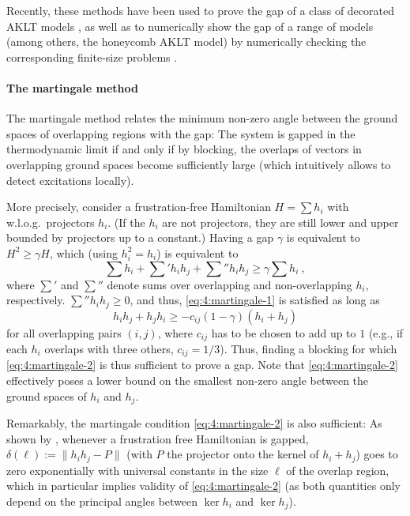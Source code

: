 \documentclass[rmp,aps,reprint,superscriptaddress,nobalancelastpage]{revtex4-1}
\begin{document}
    Recently, these methods have been used to prove the gap of a class of decorated AKLT models \cite{abdul2019class}, as well as to numerically show the gap of a range of models (among others, the honeycomb AKLT model) by numerically checking the corresponding finite-size problems \cite{lemm2019existence,pomata2019demonstrating}.



    \paragraph{The martingale method}

    The martingale method \cite{fannes:FCS,nachtergaele:degen-mps,kastoryano:martingale} relates the minimum non-zero angle between the ground spaces of overlapping regions with the gap: The system is gapped in the thermodynamic limit if and only if by blocking, the overlaps of vectors in overlapping ground spaces become sufficiently large (which intuitively allows to detect excitations locally).

    More precisely, consider a frustration-free Hamiltonian $H=\sum h_i$ with w.l.o.g.\ projectors $h_i$. (If the $h_i$ are not projectors, they are still lower and upper bounded by projectors up to a constant.) Having a gap $\gamma$ is equivalent to $H^2 \ge \gamma H$, which (using $h_i^2=h_i$) is equivalent to
    \begin{equation}
        \label{eq:4:martingale-1}
        \sum h_i + \sum\nolimits' h_i h_j + \sum\nolimits'' h_ih_j \ge \gamma \sum h_i\ ,
    \end{equation}
    where $\sum'$ and $\sum''$ denote sums over overlapping and non-overlapping $h_i$, respectively.  $\sum''h_ih_j\ge0$, and thus, \eqref{eq:4:martingale-1} is satisfied as long as
    \begin{equation}
        \label{eq:4:martingale-2}
        h_ih_j+h_jh_i \ge -c_{ij} (1-\gamma)(h_i+h_j)
    \end{equation}
    for all overlapping pairs $(i,j)$, where $c_{ij}$ has to be chosen to add up to $1$ (e.g., if each $h_i$ overlaps with three others, $c_{ij}=1/3$).  Thus, finding a blocking for which \eqref{eq:4:martingale-2} is thus sufficient to prove a gap. Note that \eqref{eq:4:martingale-2} effectively poses a lower bound on the smallest non-zero angle between the ground spaces of $h_i$ and $h_j$.

    Remarkably, the martingale condition \eqref{eq:4:martingale-2} is also sufficient: As shown by \textcite{kastoryano:martingale}, whenever a frustration free Hamiltonian is gapped, $\delta(\ell):=\|h_ih_j-P\|$ (with $P$ the projector onto the kernel of $h_i+h_j$) goes to zero exponentially with universal constants in the size $\ell$ of the overlap region, which in particular implies validity of \eqref{eq:4:martingale-2} (as both quantities only depend on the principal angles between $\ker h_i$ and $\ker h_j$).
\end{document}
